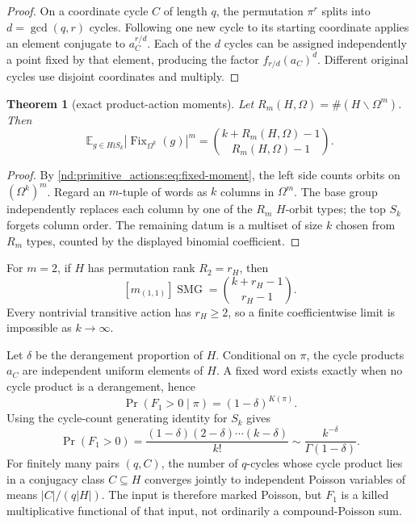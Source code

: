 \documentclass[10pt]{article}
\newcommand{\Fix}{\operatorname{Fix}}
\newcommand{\SMG}{\operatorname{SMG}}
\newcommand{\MGF}{\SMG}
\newcommand{\E}{\mathbb E}
\newtheorem{theorem}{Theorem}
\begin{document}
\begin{proof}
On a coordinate cycle $C$ of length $q$, the permutation $\pi^r$ splits into
$d=\gcd(q,r)$ cycles.  Following one new cycle to its starting coordinate
applies an element conjugate to $a_C^{r/d}$.  Each of the $d$ cycles can be
assigned independently a point fixed by that element, producing the factor
$f_{r/d}(a_C)^d$.  Different original cycles use disjoint coordinates and
multiply.
\end{proof}

\begin{theorem}[exact product-action moments]\label{nd:primitive_actions:thm:product-moment}
Let $R_m(H,\Omega)=\#(H\backslash\Omega^m)$.  Then
\begin{equation}\label{nd:primitive_actions:eq:product-moment}
 \boxed{\E_{g\in H\wr S_k}|\Fix_{\Omega^k}(g)|^m
 =\binom{k+R_m(H,\Omega)-1}{R_m(H,\Omega)-1}.}
\end{equation}
\end{theorem}

\begin{proof}
By \eqref{nd:primitive_actions:eq:fixed-moment}, the left side counts orbits on
$(\Omega^k)^m$.  Regard an $m$-tuple of words as $k$ columns in $\Omega^m$.
The base group independently replaces each column by one of the $R_m$
$H$-orbit types; the top $S_k$ forgets column order.  The remaining datum is
a multiset of size $k$ chosen from $R_m$ types, counted by the displayed
binomial coefficient.
\end{proof}

For $m=2$, if $H$ has permutation rank $R_2=r_H$, then
\[
 [m_{(1,1)}]\MGF=\binom{k+r_H-1}{r_H-1}.
\]
Every nontrivial transitive action has $r_H\ge2$, so a finite coefficientwise
limit is impossible as $k\to\infty$.

Let $\delta$ be the derangement proportion of $H$.  Conditional on $\pi$,
the cycle products $a_C$ are independent uniform elements of $H$.  A fixed
word exists exactly when no cycle product is a derangement, hence
\[
 \Pr(F_1>0\mid\pi)=(1-\delta)^{K(\pi)}.
\]
Using the cycle-count generating identity for $S_k$ gives
\begin{equation}\label{nd:primitive_actions:eq:product-survival}
 \boxed{\Pr(F_1>0)=\frac{(1-\delta)(2-\delta)\cdots(k-\delta)}{k!}
 \sim\frac{k^{-\delta}}{\Gamma(1-\delta)}.}
\end{equation}
For finitely many pairs $(q,C)$, the number of $q$-cycles whose cycle product
lies in a conjugacy class $C\subseteq H$ converges jointly to independent
Poisson variables of means $|C|/(q|H|)$.  The input is therefore marked
Poisson, but $F_1$ is a killed multiplicative functional of that input, not
ordinarily a compound-Poisson sum.
\end{document}
